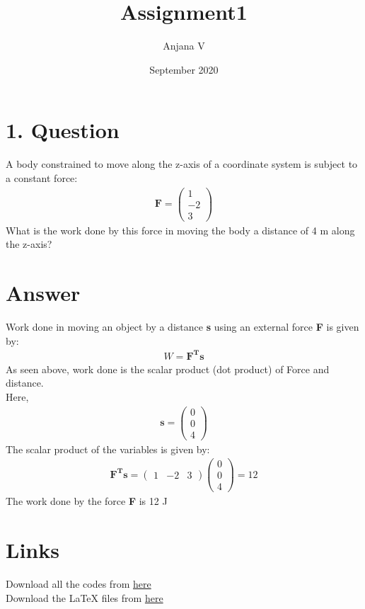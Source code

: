 \documentclass{article}
\title{Assignment1}
\author{Anjana V }
\date{September 2020}
\begin{document}
\newcommand{\myvec}[1]{\ensuremath{\begin{pmatrix}#1\end{pmatrix}}}
\renewcommand{\vec}[1]{\mathbf{#1}}
\maketitle
\section{1. Question}
A body constrained to move along the z-axis of a coordinate system is subject to a constant force:
\begin{align}
\vec{F}=\myvec{1\\-2\\3}    
\end{align}
What is the work done by this force in moving the body a distance of 4 m along the z-axis?
\section{Answer}
Work done in moving an object by a distance \textbf{s} using an external force \textbf{F} is given by:
\begin{align}
W = \vec{F^T}\vec{s}
\end{align}
As seen above, work done is the scalar product (dot product) of Force and distance.
\\Here, 
\begin{align}
\vec{s}=\myvec{0\\0\\4}   
\end{align}
The scalar product of the variables is given by:
\begin{align}
\vec{F^T}\vec{s} = \myvec{1 & -2 & 3} \myvec{0\\0\\4} = 12
\end{align}
The work done by the force \textbf{F} is 12 J
\section*{Links}
Download all the codes from \href{https://github.com/anjanavasudevan/grad_schoolwork/blob/master/EE5609/Assignment1/assignment.py}{here} 
\\Download the LaTeX files from \href{https://github.com/anjanavasudevan/grad_schoolwork/tree/master/EE5609/Assignment1/latex}{here}
\end{document}
